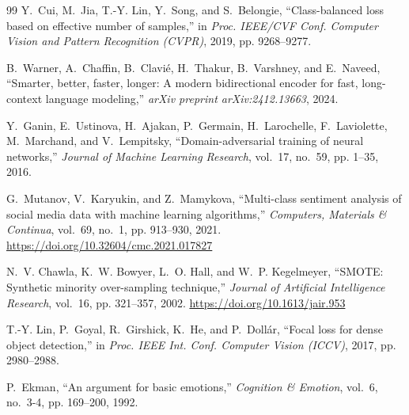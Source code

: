 \documentclass[journal,twocolumn]{article}
\begin{document}
\begin{thebibliography}{99}
Y.~Cui, M.~Jia, T.-Y. Lin, Y.~Song, and S.~Belongie, ``Class-balanced loss based on effective number of samples,'' in \emph{Proc. IEEE/CVF Conf. Computer Vision and Pattern Recognition (CVPR)}, 2019, pp. 9268--9277.

B.~Warner, A.~Chaffin, B.~Clavié, H.~Thakur, B.~Varshney, and E.~Naveed, ``Smarter, better, faster, longer: A modern bidirectional encoder for fast, long-context language modeling,'' \emph{arXiv preprint arXiv:2412.13663}, 2024.

Y.~Ganin, E.~Ustinova, H.~Ajakan, P.~Germain, H.~Larochelle, F.~Laviolette, M.~Marchand, and V.~Lempitsky, ``Domain-adversarial training of neural networks,'' \emph{Journal of Machine Learning Research}, vol.~17, no.~59, pp. 1--35, 2016.

G.~Mutanov, V.~Karyukin, and Z.~Mamykova, ``Multi-class sentiment analysis of social media data with machine learning algorithms,'' \emph{Computers, Materials \& Continua}, vol.~69, no.~1, pp. 913--930, 2021. \url{https://doi.org/10.32604/cmc.2021.017827}

N.~V. Chawla, K.~W. Bowyer, L.~O. Hall, and W.~P. Kegelmeyer, ``SMOTE: Synthetic minority over-sampling technique,'' \emph{Journal of Artificial Intelligence Research}, vol.~16, pp. 321--357, 2002. \url{https://doi.org/10.1613/jair.953}

T.-Y. Lin, P.~Goyal, R.~Girshick, K.~He, and P.~Doll{\'a}r, ``Focal loss for dense object detection,'' in \emph{Proc. IEEE Int. Conf. Computer Vision (ICCV)}, 2017, pp. 2980--2988.

P.~Ekman, ``An argument for basic emotions,'' \emph{Cognition \& Emotion}, vol.~6, no.~3-4, pp. 169--200, 1992.

\end{thebibliography}
\end{document}

